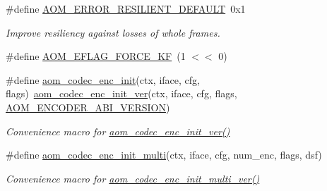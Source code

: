 \begin{DoxyCompactItemize}
\#define \hyperlink{group__encoder_ga4118658e1fc1590f72fec38478ae230d}{A\+O\+M\+\_\+\+E\+R\+R\+O\+R\+\_\+\+R\+E\+S\+I\+L\+I\+E\+N\+T\+\_\+\+D\+E\+F\+A\+U\+LT}~0x1
\begin{DoxyCompactList}\small\item\em Improve resiliency against losses of whole frames. \end{DoxyCompactList}\item 
\#define \hyperlink{group__encoder_ga86a6a9053205149cccc98481b5460337}{A\+O\+M\+\_\+\+E\+F\+L\+A\+G\+\_\+\+F\+O\+R\+C\+E\+\_\+\+KF}~(1 $<$$<$ 0)
\item 
\#define \hyperlink{group__encoder_gaade68a7d33d30f97dc9a596aa5e065d8}{aom\+\_\+codec\+\_\+enc\+\_\+init}(ctx,  iface,  cfg,  flags)~\hyperlink{group__encoder_ga205cf6f9460f4b4a842872012ef6fb0c}{aom\+\_\+codec\+\_\+enc\+\_\+init\+\_\+ver}(ctx, iface, cfg, flags, \hyperlink{group__encoder_gae4af664f2049d5b7d7b644d9a61d497c}{A\+O\+M\+\_\+\+E\+N\+C\+O\+D\+E\+R\+\_\+\+A\+B\+I\+\_\+\+V\+E\+R\+S\+I\+ON})
\begin{DoxyCompactList}\small\item\em Convenience macro for \hyperlink{group__encoder_ga205cf6f9460f4b4a842872012ef6fb0c}{aom\+\_\+codec\+\_\+enc\+\_\+init\+\_\+ver()} \end{DoxyCompactList}\item 
\#define \hyperlink{group__encoder_ga4410c689b0f8d0b75aca881ff7b25253}{aom\+\_\+codec\+\_\+enc\+\_\+init\+\_\+multi}(ctx,  iface,  cfg,  num\+\_\+enc,  flags,  dsf)
\begin{DoxyCompactList}\small\item\em Convenience macro for \hyperlink{group__encoder_gad3dfb2298402298abadb2c1b059b5f0b}{aom\+\_\+codec\+\_\+enc\+\_\+init\+\_\+multi\+\_\+ver()} \end{DoxyCompactList}\end{DoxyCompactItemize}
